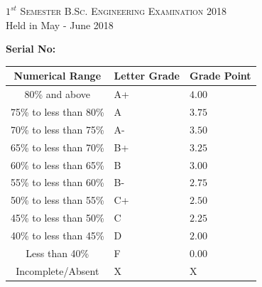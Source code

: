 \documentclass[11pt]{article}
\begin{document}
\begin{table}[ht]
\begin{minipage}[b]{0.35\textwidth}
            \smallskip
            \textsc{$1^{st}$ Semester B.Sc. Engineering Examination 2018}\\
            {Held in May  - June 2018}\\
            \end{minipage}
            \hspace{0.2cm}
            \begin{minipage}[m]{0.3\linewidth} \flushright
            \vspace*{-1.5in}  
            {\flushright \bf	Serial No:\sl \\}
            \vspace{4mm}
            \begin{small}
            \renewcommand{\arraystretch}{1.01}
            \begin{tabular}{ |c|>{\centering}m{0.9cm}|m{0.91cm}|} 
                \hline {\bf Numerical Range} & {\bf Letter Grade} & {\bf Grade Point} \\
            \hline   80\% and above & A+ & $4.00$  \\ 
            \hline   75\% to less than 80\% &  A & $3.75$\\ 
            \hline   70\% to less than 75\% &  A- & $3.50$ \\ 
            \hline   65\% to less than 70\% &  B+ & $3.25$\\ 
            \hline   60\% to less than 65\% &  B  & $3.00$\\ 
            \hline   55\% to less than 60\% &  B- & $2.75$\\ 
            \hline   50\% to less than 55\% &  C+ & $2.50$\\ 
            \hline   45\% to less than 50\% &  C  & $2.25$\\
            \hline   40\% to less than 45\% &  D  & $2.00$\\
            \hline   Less than 40\%         &  F  & $0.00$\\ 
            \hline   Incomplete/Absent         &  X  & X\\ 
            \hline 
            
            \end{tabular}
            \end{small} 
            \end{minipage}
            \end{table}
            \vspace*{-0.5cm}
\end{document}
